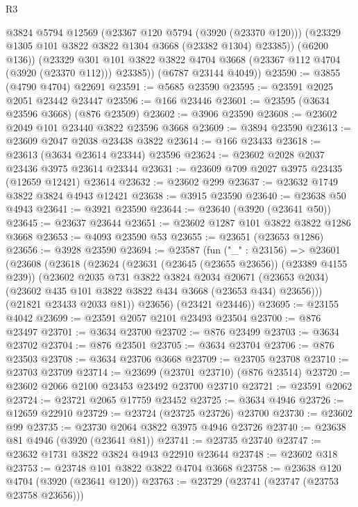 \begin{lexlean}{R3}
\begin{coremodule}
            @3824
            @5794
            @12569
            (@23367 @120 @5794 (@3920 (@23370 @120)))
            (@23329 @1305 @101 @3822 @3822 @1304 @3668 (@23382 @1304) @23385))
          (@6200 @136))
        (@23329 @301 @101 @3822 @3822 @4704 @3668 (@23367 @112 @4704 (@3920 (@23370 @112))) @23385))
      (@6787 @23144 @4049))
@23590 := @3855 (@4790 @4704) @22691
@23591 := @5685 @23590
@23595 := @23591 @2025 @2051 @23442 @23447
@23596 := @166 @23446
@23601 := @23595 (@3634 @23596 @3668) (@876 @23509)
@23602 := @3906 @23590
@23608 := @23602 @2049 @101 @23440 @3822 @23596 @3668
@23609 := @3894 @23590
@23613 := @23609 @2047 @2038 @23438 @3822
@23614 := @166 @23433
@23618 := @23613 (@3634 @23614 @23344) @23596
@23624 := @23602 @2028 @2037 @23436 @3975 @23614 @23344
@23631 := @23609 @709 @2027 @3975 @23435 (@12659 @12421) @23614
@23632 := @23602 @299
@23637 := @23632 @1749 @3822 @3824 @4943 @12421
@23638 := @3915 @23590
@23640 := @23638 @50 @4943
@23641 := @3921 @23590
@23644 := @23640 (@3920 (@23641 @50))
@23645 := @23637 @23644
@23651 := @23602 @1287 @101 @3822 @3822 @1286 @3668
@23653 := @4093 @23590 @53
@23655 := @23651 (@23653 @1286)
@23656 := @3928 @23590
@23694 := @23587
    (fun ("_" : @23156) =>
    @23601
      (@23608
        (@23618
          (@23624
            (@23631 (@23645 (@23655 @23656)) (@23389 @4155 @239))
            (@23602
              @2035
              @731
              @3822
              @3824
              @2034
              @20671
              (@23653 @2034)
              (@23602 @435 @101 @3822 @3822 @434 @3668 (@23653 @434) @23656)))
          (@21821 @23433 @2033 @81))
        @23656)
      (@23421 @23446))
@23695 := @23155 @4042
@23699 := @23591 @2057 @2101 @23493 @23504
@23700 := @876 @23497
@23701 := @3634 @23700
@23702 := @876 @23499
@23703 := @3634 @23702
@23704 := @876 @23501
@23705 := @3634 @23704
@23706 := @876 @23503
@23708 := @3634 @23706 @3668
@23709 := @23705 @23708
@23710 := @23703 @23709
@23714 := @23699 (@23701 @23710) (@876 @23514)
@23720 := @23602 @2066 @2100 @23453 @23492 @23700 @23710
@23721 := @23591 @2062
@23724 := @23721 @2065 @17759 @23452
@23725 := @3634 @4946
@23726 := @12659 @22910
@23729 := @23724 (@23725 @23726) @23700
@23730 := @23602 @99
@23735 := @23730 @2064 @3822 @3975 @4946 @23726
@23740 := @23638 @81 @4946 (@3920 (@23641 @81))
@23741 := @23735 @23740
@23747 := @23632 @1731 @3822 @3824 @4943 @22910 @23644
@23748 := @23602 @318
@23753 := @23748 @101 @3822 @3822 @4704 @3668
@23758 := @23638 @120 @4704 (@3920 (@23641 @120))
@23763 := @23729 (@23741 (@23747 (@23753 @23758 @23656)))

\end{coremodule}
\end{lexlean}
